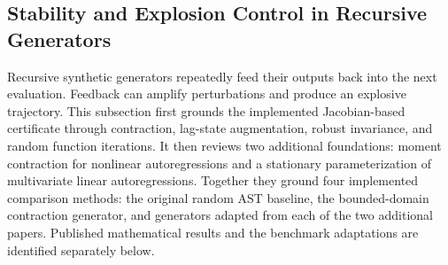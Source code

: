 \subsection{Stability and Explosion Control in Recursive Generators}
\label{sec:explosion-treatment}

Recursive synthetic generators repeatedly feed their outputs back into the
next evaluation. Feedback can amplify perturbations and produce an explosive
trajectory. This subsection first grounds the implemented Jacobian-based
certificate through contraction, lag-state augmentation, robust invariance,
and random function iterations. It then reviews two additional foundations:
moment contraction for nonlinear autoregressions and a stationary
parameterization of multivariate linear autoregressions. Together they ground
four implemented comparison methods: the original random AST baseline, the
bounded-domain contraction generator, and generators adapted from each of
the two additional papers. Published mathematical results and the
benchmark adaptations are identified separately below.








